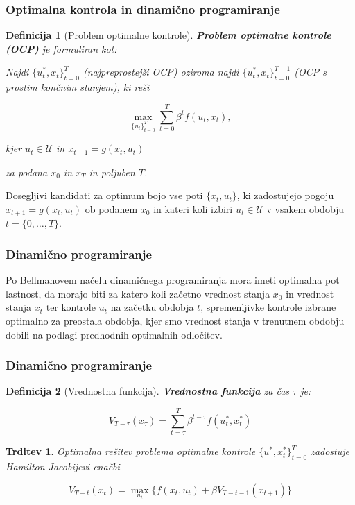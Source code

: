 \documentclass{beamer}
\newtheorem{defn}{Definicija}
\newtheorem{trd}{Trditev}
\begin{document}
\begin{frame}
\frametitle{Optimalna kontrola in dinamično programiranje}

\begin{defn}[Problem optimalne kontrole]
\textbf{Problem optimalne kontrole (OCP)} je formuliran kot: \newline

Najdi $\{u_t^*,x_t\}_{t=0}^T$ (\textit{najpreprostejši OCP}) oziroma najdi $\{u_t^*,x_t\}_{t=0}^{T-1}$ (\textit{OCP s prostim končnim stanjem}), ki reši

\begin{equation}
\max_{\{u_t\}_{t=0}^T} \sum_{t=0}^T \beta^t f(u_t,x_t),
\end{equation}

kjer $u_t \in \mathcal{U}$ in $x_{t+1} = g(x_t,u_t)$ \newline

za podana $x_0$ in $x_T$ in poljuben $T$.

\end{defn}

Dosegljivi kandidati za optimum bojo vse poti $\{x_t,u_t\}$, ki zadostujejo pogoju $x_{t+1} = g(x_t,u_t)$ ob podanem $x_0$ in kateri koli izbiri $u_t \in \mathcal{U}$ v vsakem obdobju $t=\{0, \ldots, T\}$.

\end{frame}

\begin{frame}
\frametitle{Dinamično programiranje}

Po Bellmanovem načelu dinamičnega programiranja mora imeti optimalna pot lastnost, da morajo biti za katero koli začetno vrednost stanja $x_0$ in vrednost stanja $x_t$ ter kontrole $u_t$ na začetku obdobja $t$, spremenljivke kontrole izbrane optimalno za preostala obdobja, kjer smo vrednost stanja v trenutnem obdobju dobili na podlagi predhodnih optimalnih odločitev.

\end{frame}

\begin{frame}
\frametitle{Dinamično programiranje}

\begin{defn}[Vrednostna funkcija]

\textbf{Vrednostna funkcija} za čas $\tau$ je:

\begin{equation}
V_{T-{\tau}}(x_{\tau}) = \sum_{t=\tau}^T \beta^{t-\tau} f(u_t^*,x_t^*)
\end{equation}

\end{defn}


\begin{trd}
Optimalna rešitev problema optimalne kontrole  $\{u^*,x_t^*\}_{t=0}^T$ zadostuje Hamilton-Jacobijevi enačbi

\begin{equation}
V_{T-t}(x_t) = \max_{u_t} \{f(x_t,u_t) + \beta V_{T-t-1}(x_{t+1})\}
\end{equation}
\end{trd}

\end{frame}
\end{document}
